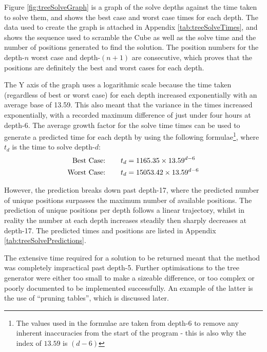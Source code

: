 \documentclass{report}
\newcommand{\depth}[1]{depth-#1}
\begin{document}
    Figure \ref{fig:treeSolveGraph} is a graph of the solve depths against the time taken to solve them, and shows the best case and worst case times for each depth. The data used to create the graph is attached in Appendix \ref{tab:treeSolveTimes}, and shows the sequence used to scramble the Cube as well as the solve time and the number of positions generated to find the solution. The position numbers for the \depth{$n$} worst case and \depth{$(n+1)$} are consecutive, which proves that the positions are definitely the best and worst cases for each depth.
    
    The Y axis of the graph uses a logarithmic scale because the time taken (regardless of best or worst case) for each depth increased exponentially with an average base of 13.59. This also meant that the variance in the times increased exponentially, with a recorded maximum difference of just under four hours at \depth{6}. The average growth factor for the solve time times can be used to generate a predicted time for each depth by using the following formulae\footnote{The values used in the formulae are taken from \depth{6} to remove any inherent inaccuracies from the start of the program - this is also why the index of $13.59$ is $(d-6)$}, where $t_d$ is the time to solve \depth{$d$}:
   	\begin{align*}
   	\text{Best Case:}\hspace{7.5mm} 	&	t_d = 1165.35 \times 13.59^{d-6} \\
	\text{Worst Case:}\hspace{7.5mm}	&	t_d = 15053.42 \times 13.59^{d-6}
   	\end{align*}
   	
    However, the prediction breaks down past \depth{17}, where the predicted number of unique positions surpasses the maximum number of available positions. The prediction of unique positions per depth follows a linear trajectory, whilst in reality the number at each depth increases steadily then sharply decreases at \depth{17}. The predicted times and positions are listed in Appendix \ref{tab:treeSolvePredictions}.
    
    The extensive time required for a solution to be returned meant that the method was completely impractical past \depth{5}. Further optimisations to the tree generator were either too small to make a sizeable difference, or too complex or poorly documented to be implemented successfully. An example of the latter is the use of \enquote{pruning tables}, which is discussed later.
    
\end{document}

